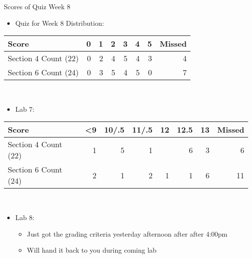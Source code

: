 \documentclass[presentation]{beamer}
\begin{document}
\begin{frame}[label=sec-4]{Scores of Quiz Week 8}
\\
\begin{itemize}
\item \alert{Quiz for Week 8} Distribution:
\end{itemize}
\begin{center}
\begin{tabular}{lrrrrrrr}
\hline
Score & 0 & 1 & 2 & 3 & 4 & 5 & Missed\\
\hline
Section \alert{4} Count (22) & 0 & 2 & 4 & 5 & 4 & 3 & 4\\
\hline
Section \alert{6} Count (24) & 0 & 3 & 5 & 4 & 5 & 0 & 7\\
\hline
\end{tabular}
\end{center}
\\
\begin{itemize}
\item \alert{Lab 7}:
\end{itemize}
\begin{center}
\begin{tabular}{lrrrrrrr}
\hline
Score & <9 & 10/.5 & 11/.5 & 12 & 12.5 & 13 & Missed\\
\hline
Section \alert{4} Count (22) & 1 & 5 & 1 &  & 6 & 3 & 6\\
\hline
Section \alert{6} Count (24) & 2 & 1 & 2 & 1 & 1 & 6 & 11\\
\hline
\end{tabular}
\end{center}
\\
\begin{itemize}
\item \alert{Lab 8}:
\begin{itemize}
\item Just got the grading criteria yesterday afternoon after after 4:00pm
\item Will hand it back to you during coming lab
\end{itemize}
\end{itemize}
\end{frame}
\end{document}
